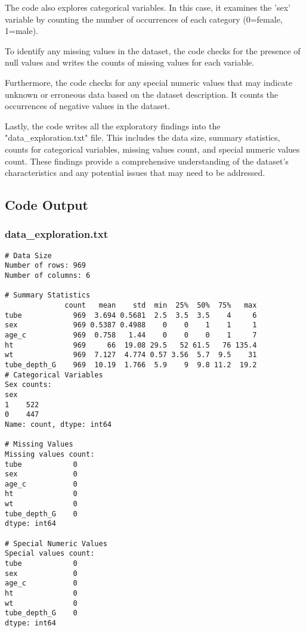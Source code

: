 \documentclass[11pt]{article}
\begin{document}
The code also explores categorical variables. In this case, it examines the 'sex' variable by counting the number of occurrences of each category (0=female, 1=male).

To identify any missing values in the dataset, the code checks for the presence of null values and writes the counts of missing values for each variable.

Furthermore, the code checks for any special numeric values that may indicate unknown or erroneous data based on the dataset description. It counts the occurrences of negative values in the dataset.

Lastly, the code writes all the exploratory findings into the "data\_exploration.txt" file. This includes the data size, summary statistics, counts for categorical variables, missing values count, and special numeric values count. These findings provide a comprehensive understanding of the dataset's characteristics and any potential issues that may need to be addressed.

\subsection{Code Output}

\subsubsection*{data\_exploration.txt}

\begin{Verbatim}[tabsize=4]
# Data Size
Number of rows: 969
Number of columns: 6

# Summary Statistics
              count   mean    std  min  25%  50%  75%   max
tube            969  3.694 0.5681  2.5  3.5  3.5    4     6
sex             969 0.5387 0.4988    0    0    1    1     1
age_c           969  0.758   1.44    0    0    0    1     7
ht              969     66  19.08 29.5   52 61.5   76 135.4
wt              969  7.127  4.774 0.57 3.56  5.7  9.5    31
tube_depth_G    969  10.19  1.766  5.9    9  9.8 11.2  19.2
# Categorical Variables
Sex counts:
sex
1    522
0    447
Name: count, dtype: int64

# Missing Values
Missing values count:
tube            0
sex             0
age_c           0
ht              0
wt              0
tube_depth_G    0
dtype: int64

# Special Numeric Values
Special values count:
tube            0
sex             0
age_c           0
ht              0
wt              0
tube_depth_G    0
dtype: int64

\end{Verbatim}
\end{document}
